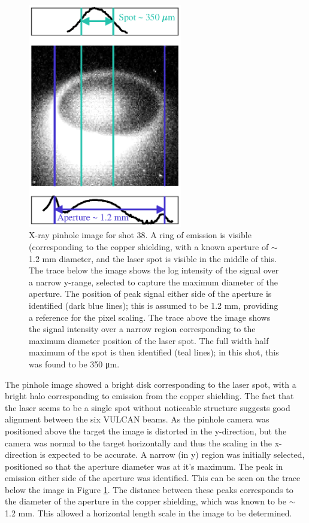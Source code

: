 \begin{figure} [h]
\begin{centering}
\includegraphics[width=0.6\textwidth]{figures/Experiment/PinholeAnalysis.eps}%
\caption{\label{fig:Pinhole Analysis} X-ray pinhole image for shot 38. A ring of emission is visible (corresponding to the copper shielding, with a known aperture of $\sim$ 1.2 \unit{\milli\meter} diameter, and the laser spot is visible in the middle of this. The trace below the image shows the log intensity of the signal over a narrow y-range, selected to capture the maximum diameter of the aperture. The position of peak signal either side of the aperture is identified (dark blue lines); this is assumed to be 1.2 \unit{\milli\meter}, providing a reference for the pixel scaling. The trace above the image shows the signal intensity over a narrow region corresponding to the maximum diameter position of the laser spot. The full width half maximum of the spot is then identified (teal lines); in this shot, this was found to be 350 \unit{\micro\meter}.}
\end{centering}
\end{figure}

The pinhole image showed a bright disk corresponding to the laser spot, with a bright halo corresponding to emission from the copper shielding. The fact that the laser seems to be a single spot without noticeable structure suggests good alignment between the six VULCAN beams. As the pinhole camera was positioned above the target the image is distorted in the y-direction, but the camera was normal to the target horizontally and thus the scaling in the x-direction is expected to be accurate. A narrow (in y) region was initially selected, positioned so that the aperture diameter was at it's maximum. The peak in emission either side of the aperture was identified. This can be seen on the trace below the image in Figure \ref{fig:Pinhole Analysis}. The distance between these peaks corresponds to the diameter of the aperture in the copper shielding, which was known to be $\sim$ 1.2 \unit{\milli\meter}. This allowed a horizontal length scale in the image to be determined.

